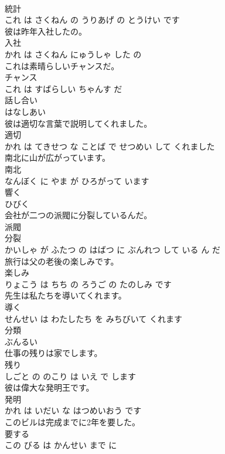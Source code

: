 \documentclass[8pt]{extreport}
\begin{document}
\begin{CJK}{UTF8}{min}
\\	統計 
\\	これ は さくねん の うりあげ の とうけい です			
\\	彼は昨年入社したの。	
\\	入社 
\\	かれ は さくねん にゅうしゃ した の			
\\	これは素晴らしいチャンスだ。	
\\	チャンス 
\\	これ は すばらしい ちゃんす だ			
\\	話し合い	
\\	はなしあい			
\\	彼は適切な言葉で説明してくれました。	
\\	適切 
\\	かれ は てきせつ な ことば で せつめい して くれました			
\\	南北に山が広がっています。	
\\	南北 
\\	なんぼく に やま が ひろがって います			
\\	響く	
\\	ひびく			
\\	会社が二つの派閥に分裂しているんだ。	
\\	派閥 
\\	分裂 
\\	かいしゃ が ふたつ の はばつ に ぶんれつ して いる ん だ			
\\	旅行は父の老後の楽しみです。	
\\	楽しみ 
\\	りょこう は ちち の ろうご の たのしみ です			
\\	先生は私たちを導いてくれます。	
\\	導く 
\\	せんせい は わたしたち を みちびいて くれます			
\\	分類	
\\	ぶんるい			
\\	仕事の残りは家でします。	
\\	残り 
\\	しごと の のこり は いえ で します			
\\	彼は偉大な発明王です。	
\\	発明 
\\	かれ は いだい な はつめいおう です			
\\	このビルは完成までに2年を要した。	
\\	要する 
\\	この びる は かんせい まで に 

\end{CJK}
\end{document}
